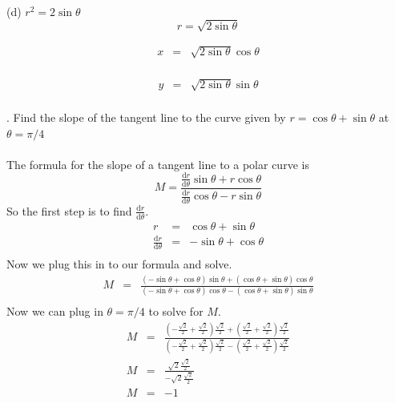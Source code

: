 \documentclass[11pt]{exam}
\begin{document}
\\
\indent (d) $r^2 = 2\sin\theta$
\\
$$r = \sqrt{2\sin\theta}$$
\noindent
\begin{minipage}{.5\linewidth}
	\begin{eqnarray*}
		x &=& \sqrt{2\sin\theta}\cos\theta \\
	\end{eqnarray*}
\end{minipage}
\begin{minipage}{.5\linewidth}
	\begin{eqnarray*}
		y &=& \sqrt{2\sin\theta}\sin\theta \\
	\end{eqnarray*}
\end{minipage}


. Find the slope of the tangent line to the curve given by $r = \cos \theta + \sin \theta$ at $\theta = \pi/4$ \\
\\
The formula for the slope of a tangent line to a polar curve is
$$M = \frac{\frac{\mathrm{d}r}{\mathrm{d}\theta}\sin \theta + r\cos \theta}{\frac{\mathrm{d}r}{\mathrm{d}\theta}\cos \theta - r\sin \theta}$$
So the first step is to find $\frac{\mathrm{d}r}{\mathrm{d}\theta}$.
\begin{eqnarray*}
  	r&=&\cos \theta + \sin \theta \\
  	\frac{\mathrm{d}r}{\mathrm{d}\theta}&=& -\sin \theta + \cos \theta \\
\end{eqnarray*}
Now we plug this in to our formula and solve.\\
\begin{eqnarray*}
	M &=& \frac{(-\sin \theta + \cos \theta)\sin \theta + (\cos \theta + \sin \theta )\cos \theta}
			   {(-\sin \theta + \cos \theta)\cos \theta - (\cos \theta + \sin \theta )\sin \theta} \\
\end{eqnarray*} 
Now we can plug in $\theta = \pi/4$ to solve for $M$. \\
\begin{eqnarray*}
	M &=& \frac{\left(- \frac{\sqrt{2}}{2} + \frac{\sqrt{2}}{2} \right) \frac{\sqrt{2}}{2} + \left( \frac{\sqrt{2}}{2} + \frac{\sqrt{2}}{2} \right) \frac{\sqrt{2}}{2} }
	 		   {\left(- \frac{\sqrt{2}}{2} + \frac{\sqrt{2}}{2} \right) \frac{\sqrt{2}}{2} - \left( \frac{\sqrt{2}}{2} + \frac{\sqrt{2}}{2} \right) \frac{\sqrt{2}}{2}}\\
	M &=& \frac{\sqrt{2} \frac{\sqrt{2}}{2} }{ - \sqrt{2} \frac{\sqrt{2}}{2} }\\
	M &=& -1\\
\end{eqnarray*}
\end{document}
